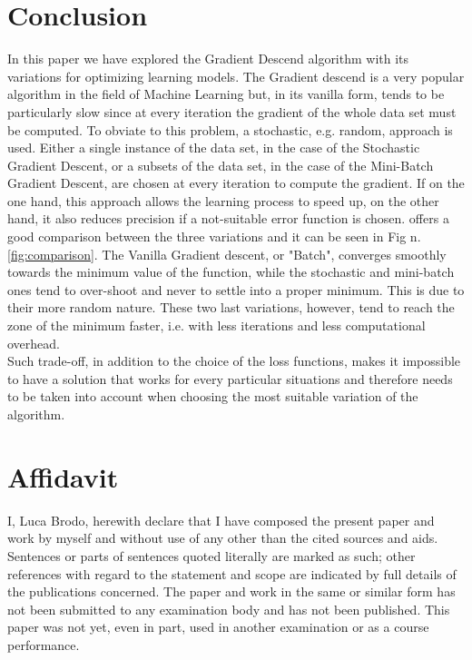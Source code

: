 \documentclass[conference]{IEEEtran}
\begin{document}
\section{Conclusion}

In this paper we have explored the Gradient Descend algorithm with its variations for optimizing learning models. The Gradient descend is a very popular algorithm in the field of Machine Learning but, in its vanilla form, tends to be particularly slow since at every iteration the gradient of the whole data set must be computed. To obviate to this problem, a stochastic, e.g. random, approach is used. Either a single instance of the data set, in the case of the Stochastic Gradient Descent, or a subsets of the data set, in the case of the Mini-Batch Gradient Descent, are chosen at every iteration to compute the gradient. If on the one hand, this approach allows the learning process to speed up, on the other hand, it also reduces precision if a not-suitable error function is chosen. 
\cite{Scikit-Learn} offers a good comparison between the three variations and it can be seen in Fig n.\ref{fig:comparison}.
The Vanilla Gradient descent, or "Batch", converges smoothly towards the minimum value of the function, while the stochastic and mini-batch ones tend to over-shoot and never to settle into a proper minimum. This is due to their more random nature. These two last variations, however,  tend to reach the zone of the minimum faster, i.e. with less iterations and less computational overhead. \\
Such trade-off, in addition to the choice of the loss functions, makes it impossible to have a solution that works for every particular situations and therefore needs to be taken into account when choosing the most suitable variation of the algorithm. 




\newpage

\section{Affidavit}
I, Luca Brodo,  herewith declare that I have composed the present paper and work by myself and without use of any other than the cited sources and aids. Sentences or parts of sentences quoted literally are marked as such; other references with regard to the statement and scope are indicated by full details of the publications concerned. The paper and work in the same or similar form has not been submitted to any examination body and has not been published. This paper was not yet, even in part, used in another examination or as a course performance.



 
\end{document}
